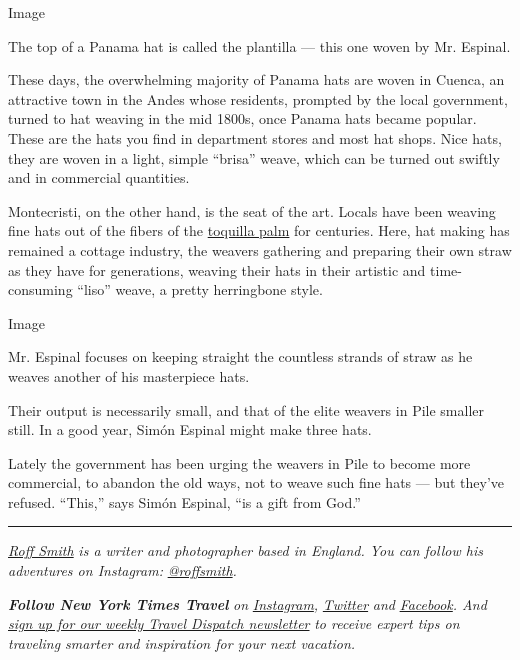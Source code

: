 Image

The top of a Panama hat is called the plantilla --- this one woven by
Mr. Espinal.

These days, the overwhelming majority of Panama hats are woven in
Cuenca, an attractive town in the Andes whose residents, prompted by the
local government, turned to hat weaving in the mid 1800s, once Panama
hats became popular. These are the hats you find in department stores
and most hat shops. Nice hats, they are woven in a light, simple
``brisa'' weave, which can be turned out swiftly and in commercial
quantities.

Montecristi, on the other hand, is the seat of the art. Locals have been
weaving fine hats out of the fibers of the
\href{https://timesmachine.nytimes.com/timesmachine/1900/09/02/101066082.html?pageNumber=24}{toquilla
palm} for centuries. Here, hat making has remained a cottage industry,
the weavers gathering and preparing their own straw as they have for
generations, weaving their hats in their artistic and time-consuming
``liso'' weave, a pretty herringbone style.

Image

Mr. Espinal focuses on keeping straight the countless strands of straw
as he weaves another of his masterpiece hats.

Their output is necessarily small, and that of the elite weavers in Pile
smaller still. In a good year, Simón Espinal might make three hats.

Lately the government has been urging the weavers in Pile to become more
commercial, to abandon the old ways, not to weave such fine hats --- but
they've refused. ``This,'' says Simón Espinal, ``is a gift from God.''

\begin{center}\rule{0.5\linewidth}{\linethickness}\end{center}

\href{http://www.roffsmithphotography.com/}{\emph{Roff Smith}} \emph{is
a writer and photographer based in England. You can follow his
adventures on Instagram:}
\href{https://www.instagram.com/roffsmith/}{\emph{@roffsmith}}\emph{.}

\emph{\textbf{Follow New York Times Travel}} \emph{on}
\href{https://www.instagram.com/nytimestravel/}{\emph{Instagram}}\emph{,}
\href{https://twitter.com/nytimestravel}{\emph{Twitter}} \emph{and}
\href{https://www.facebook.com/nytimestravel/}{\emph{Facebook}}\emph{.
And}
\href{https://www.nytimes.com/newsletters/traveldispatch}{\emph{sign up
for our weekly Travel Dispatch newsletter}} \emph{to receive expert tips
on traveling smarter and inspiration for your next vacation.}

